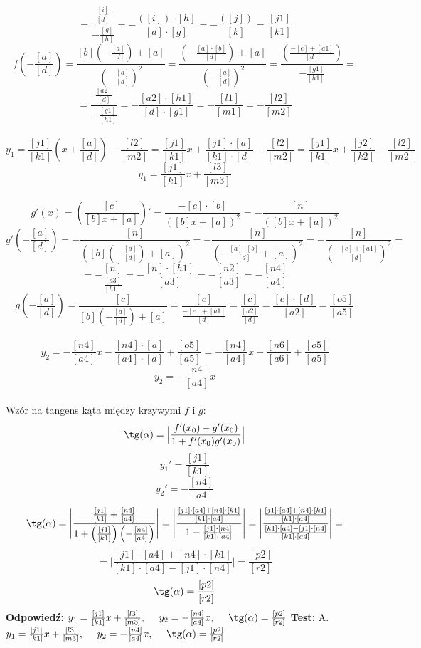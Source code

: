\documentclass[12pt, a4paper]{article}
\theoremstyle{definition} %
\newcommand{\rozwStop}{\newline}                                            %
\newcommand{\odpStart}{\noindent \textbf{Odpowiedź:}\newline}    %
\newcommand{\odpStop}{\newline}                                             %
\newcommand{\testStart}{\noindent \textbf{Test:}\newline} %
\begin{document}
$$=\frac{\frac{[i]}{[d]}}{-\frac{[g]}{[h]}}=-\frac{([i])\cdot[h]}{[d]\cdot[g]}=-\frac{([j])}{[k]} = \frac{[j1]}{[k1]}$$
$$f\left(-\frac{[a]}{[d]}\right)= \frac{[b]\left(-\frac{[a]}{[d]}\right)+[a]}{\left(-\frac{[a]}{[d]}\right)^2}
= \frac{\left(-\frac{[a]\cdot[b]}{[d]}\right)+[a]}{\left(-\frac{[a]}{[d]}\right)^2}= \frac{\left(\frac{-[e]+[a1]}{[d]}\right)}{-\frac{[g1]}{[h1]}}=$$
$$= \frac{\frac{[a2]}{[d]}}{-\frac{[g1]}{[h1]}}=- \frac{[a2]\cdot[h1]}{[d]\cdot[g1]}=-\frac{[l1]}{[m1]}=-\frac{[l2]}{[m2]}$$
\\
$$y_1=\frac{[j1]}{[k1]}\left(x+\frac{[a]}{[d]}\right)-\frac{[l2]}{[m2]}=\frac{[j1]}{[k1]}x +\frac{[j1]\cdot[a]}{[k1]\cdot[d]}-\frac{[l2]}{[m2]}=
\frac{[j1]}{[k1]}x +\frac{[j2]}{[k2]}-\frac{[l2]}{[m2]}$$
$$y_1=\frac{[j1]}{[k1]}x +\frac{[l3]}{[m3]}$$
\\
$$g'(x)=\left( \frac{[c]}{[b]x+[a]} \right)'= \frac{-[c]\cdot[b]}{([b]x+[a])^2} =  - \frac{[n]}{([b]x+[a])^2}$$
$$g'\left( -\frac{[a]}{[d]} \right)= - \frac{[n]}{\left([b]\left( -\frac{[a]}{[d]} \right)+[a]\right)^2}=- \frac{[n]}{\left(-\frac{[a]\cdot [b]}{[d]}+[a]\right)^2}=
- \frac{[n]}{\left(\frac{-[e]+[a1]}{[d]}\right)^2} =$$
 $$= - \frac{[n]}{\frac{[a3]}{[h1]}} = - \frac{[n]\cdot[h1]}{[a3]} =- \frac{[n2]}{[a3]} =- \frac{[n4]}{[a4]}$$
$$g\left( -\frac{[a]}{[d]} \right)= \frac{[c]}{[b]\left( -\frac{[a]}{[d]} \right)+[a]}=\frac{[c]}{ \frac{-[e]+[a1]}{[d]}} =\frac{[c]}{ \frac{[a2]}{[d]}} =
\frac{[c]\cdot[d]}{ [a2]}=\frac{[o5]}{ [a5]}$$
\\
$$y_2=- \frac{[n4]}{[a4]}x - \frac{[n4]\cdot[a]}{[a4]\cdot[d]} +\frac{[o5]}{ [a5]} = - \frac{[n4]}{[a4]}x - \frac{[n6]}{[a6]} +\frac{[o5]}{ [a5]} $$
$$y_2= - \frac{[n4]}{[a4]}x $$
\\
Wzór na tangens kąta między krzywymi $f$ i $g$:
$$\tg(\alpha)=\Big|\frac{f'(x_0)-g'(x_0)}{1+f'(x_0)g'(x_0)}\Big| $$
$$y_1'=\frac{[j1]}{[k1]}$$
$$y_2'=-\frac{[n4]}{[a4]}$$
$$\tg(\alpha)=\Bigg|\frac{ \frac{[j1]}{[k1]} +\frac{[n4]}{[a4]} }{1+\left( \frac{[j1]}{[k1]} \right) \left(-\frac{[n4]}{[a4]}\right)}\Bigg| =
\Bigg|\frac{ \frac{[j1]\cdot[a4]+[n4]\cdot[k1]}{[k1]\cdot[a4]}}{1- \frac{[j1]\cdot[n4]}{[k1]\cdot[a4]} }\Bigg|
=\Bigg|\frac{ \frac{[j1]\cdot[a4]+[n4]\cdot[k1]}{[k1]\cdot[a4]}}{\frac{[k1]\cdot[a4]-[j1]\cdot[n4]}{[k1]\cdot[a4]}}\Bigg|= $$
$$=\Bigg|\frac{[j1]\cdot[a4]+[n4]\cdot[k1]}{[k1]\cdot[a4]-[j1]\cdot[n4]}\Bigg|= \frac{[p2]}{[r2]}$$
$$\tg(\alpha)=\frac{[p2]}{[r2]}$$
\rozwStop
\odpStart
$y_1=\frac{[j1]}{[k1]}x +\frac{[l3]}{[m3]}, \ \ \ \ y_2= - \frac{[n4]}{[a4]}x, \ \ \ \ \tg(\alpha)=\frac{[p2]}{[r2]}$
\odpStop
\testStart
A. $y_1=\frac{[j1]}{[k1]}x +\frac{[l3]}{[m3]}, \ \ \ \ y_2= - \frac{[n4]}{[a4]}x, \ \ \ \ \tg(\alpha)=\frac{[p2]}{[r2]}$\\
\end{document}
